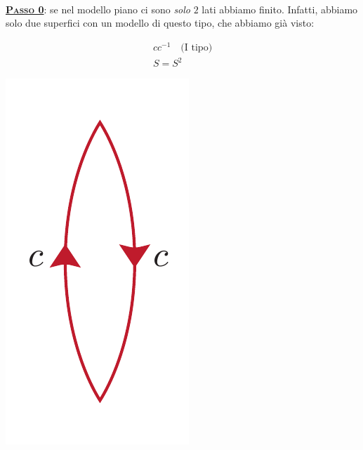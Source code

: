 \begin{demonstration}~{}\\
\textsc{\underline{\textbf{Passo 0}}}: se nel modello piano ci sono \textit{solo} $2$ lati abbiamo finito. Infatti, abbiamo solo due superfici con un modello di questo tipo, che abbiamo già visto:
\begin{center}
	\vspace{-3mm}
	\begin{minipage}{.19\linewidth}
		\begin{equation*}
			\begin{array}{cc}
				cc^{-1}\quad \text{(I tipo)}\\
				S=S^2
			\end{array}
		\end{equation*}
	\end{minipage}
	\begin{minipage}{.20\linewidth}
		\begin{center}
			\includegraphics[trim=0cm 0cm 0cm 0cm, clip, scale=0.35]{images/sphere2lines.pdf}
		\end{center}
	\end{minipage}
	\begin{minipage}{.19\linewidth}
		\begin{equation*}
			\begin{array}{cc}

\end{array}
\end{equation*}
\end{minipage}
\end{center}
\end{demonstration}
